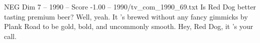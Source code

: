 \begin{textsample}{NEG Dim 7 – 1990 – Score -1.00 – 1990/tv\_com\_1990\_69.txt}  \label{ex:f7_neg_031}
Is Red Dog better tasting premium beer?
Well, yeah.
It 's brewed without any fancy gimmicks by Plank Road to be gold, bold, and uncommonly smooth.
Hey, Red Dog, it 's your call.

\end{textsample}
